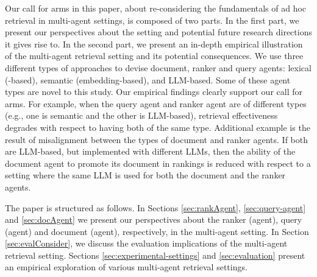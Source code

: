 Our call for arms in this paper, about re-considering the fundamentals
of ad hoc retrieval in multi-agent settings, is composed of two
parts. 
In the first part, we present our perspectives about the setting and potential future research directions it gives rise to.
In the
second part, we present an in-depth empirical illustration of the
multi-agent retrieval setting and its potential consequences. We use
three different types of approaches to devise document, ranker and
query agents: lexical (\tfidf-based), semantic (embedding-based), and
LLM-based. Some of these agent types are novel to this study.  Our
empirical findings clearly support our call for arms. For example,
when the query agent and ranker agent are of different types (e.g.,
one is semantic and the other is LLM-based), retrieval effectiveness
degrades with respect to having both of the same type. Additional example is the result of misalignment between the types of document and ranker agents. If both are LLM-based, but implemented with different LLMs, then the ability of the document agent to promote its document in rankings is reduced with respect to a setting where the same LLM is used for both the document and the ranker agents.


The paper is structured as follows. In Sections \ref{sec:rankAgent},
\ref{sec:query-agent} and \ref{sec:docAgent} we present our perspectives about
the ranker (agent), query (agent) and document (agent), respectively, in the multi-agent setting.
In
Section \ref{sec:evalConsider}, we discuss the evaluation implications of the multi-agent retrieval setting. Sections
\ref{sec:experimental-settings} 
and \ref{sec:evaluation} present an
empirical exploration of various multi-agent retrieval settings.



